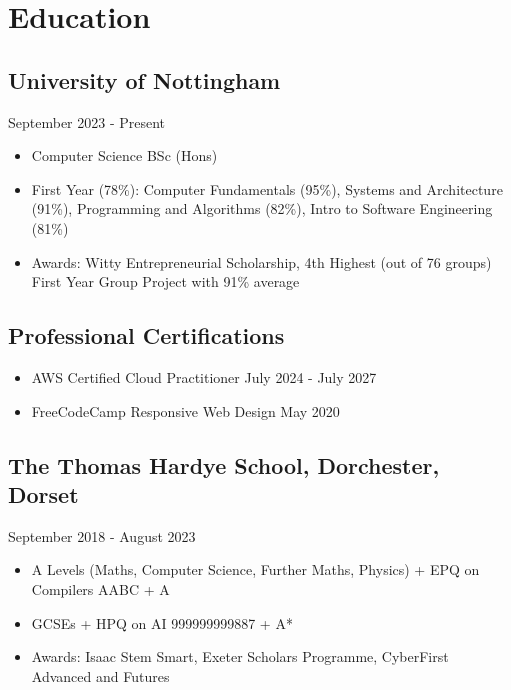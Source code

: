 \section{Education}
\subsection{University of Nottingham}{}{September 2023 - Present}
\begin{itemize}
    \item Computer Science BSc (Hons)
    \item First Year (78\%): \hfill Computer Fundamentals (95\%), Systems and Architecture (91\%), \newline \phantom{.} \hfill Programming and Algorithms (82\%), Intro to Software Engineering (81\%)
    \item Awards: \hfill Witty Entrepreneurial Scholarship, 4th Highest (out of 76 groups) First Year Group Project with 91\% average
\end{itemize}
\vspace{.1em}
\subsection{Professional Certifications}{}{}
\begin{itemize}
  \item AWS Certified Cloud Practitioner \hfill July 2024 - July 2027
  \item FreeCodeCamp Responsive Web Design \hfill May 2020
\end{itemize}
\subsection{The Thomas Hardye School, Dorchester, Dorset}{}{September 2018 - August 2023}
\begin{itemize}
\item A Levels (Maths, Computer Science, Further Maths, Physics) + EPQ on Compilers \hfill AABC + A
\item GCSEs + HPQ on AI \hfill 999999999887 + {A*}
\item Awards: \hfill Isaac Stem Smart, Exeter Scholars Programme, CyberFirst Advanced and Futures
\end{itemize}


\vspace{.3em}
